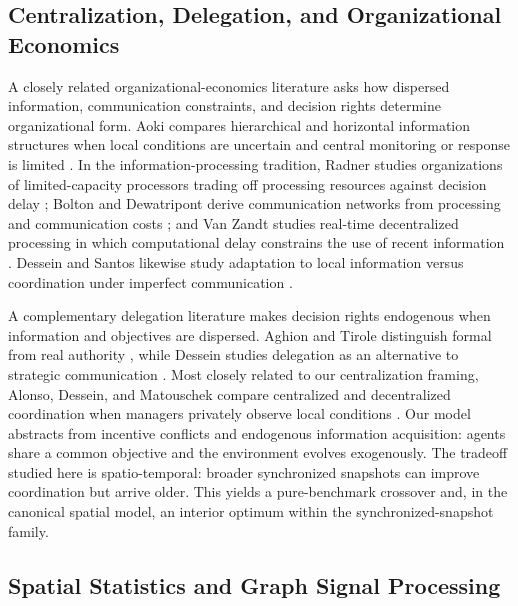 \documentclass[11pt]{article}
\begin{document}
\subsection{Centralization, Delegation, and Organizational Economics}

A closely related organizational-economics literature asks how dispersed information, communication constraints, and decision rights determine organizational form. Aoki compares hierarchical and horizontal information structures when local conditions are uncertain and central monitoring or response is limited \cite{aoki1986horizontal}. In the information-processing tradition, Radner studies organizations of limited-capacity processors trading off processing resources against decision delay \cite{radner1993organization}; Bolton and Dewatripont derive communication networks from processing and communication costs \cite{bolton1994firm}; and Van Zandt studies real-time decentralized processing in which computational delay constrains the use of recent information \cite{vanzandt1999realtime}. Dessein and Santos likewise study adaptation to local information versus coordination under imperfect communication \cite{dessein2006adaptive}.

A complementary delegation literature makes decision rights endogenous when information and objectives are dispersed. Aghion and Tirole distinguish formal from real authority \cite{aghion1997formal}, while Dessein studies delegation as an alternative to strategic communication \cite{dessein2002authority}. Most closely related to our centralization framing, Alonso, Dessein, and Matouschek compare centralized and decentralized coordination when managers privately observe local conditions \cite{alonso2008coordination}. Our model abstracts from incentive conflicts and endogenous information acquisition: agents share a common objective and the environment evolves exogenously. The tradeoff studied here is spatio-temporal: broader synchronized snapshots can improve coordination but arrive older. This yields a pure-benchmark crossover and, in the canonical spatial model, an interior optimum within the synchronized-snapshot family.

\subsection{Spatial Statistics and Graph Signal Processing}
\end{document}

